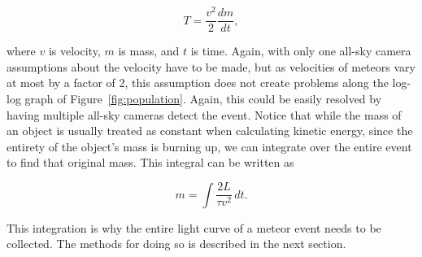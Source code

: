 \begin{equation}
	T = \frac{v^2}{2}\frac{dm}{dt},
\end{equation}

where $v$ is velocity, $m$ is mass, and $t$ is time. Again, with only one all-sky camera assumptions about the velocity have to be made, but as velocities of meteors vary at most by a factor of 2, this assumption does not create problems along the log-log graph of Figure~\ref{fig:population}. Again, this could be easily resolved by having multiple all-sky cameras detect the event. Notice that while the mass of an object is usually treated as constant when calculating kinetic energy, since the entirety of the object's mass is burning up, we can integrate over the entire event to find that original mass. This integral can be written as

\begin{equation}
m =\int \frac{2L}{\tau v^2}\,dt.
\end{equation}

This integration is why the entire light curve of a meteor event needs to be collected. The methods for doing so is described in the next section.
